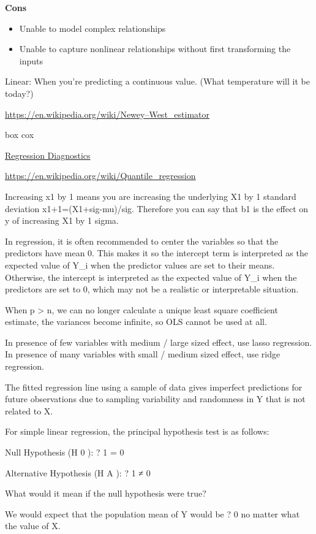 \documentclass[]{book}
\theoremstyle{definition}
\theoremstyle{definition}
\theoremstyle{definition}
\theoremstyle{remark}
\begin{document}
\textbf{Cons}

\begin{itemize}
\item
  Unable to model complex relationships
\item
  Unable to capture nonlinear relationships without first transforming
  the inputs
\end{itemize}

Linear: When you're predicting a continuous value. (What temperature
will it be today?)

\url{https://en.wikipedia.org/wiki/Newey–West_estimator}

box cox

\href{http://www.statmethods.net/stats/rdiagnostics.html}{Regression
Diagnostics}

\url{https://en.wikipedia.org/wiki/Quantile_regression}

Increasing x1 by 1 means you are increasing the underlying X1 by 1
standard deviation x1+1=(X1+sig-mu)/sig. Therefore you can say that b1
is the effect on y of increasing X1 by 1 sigma.

In regression, it is often recommended to center the variables so that
the predictors have mean 0. This makes it so the intercept term is
interpreted as the expected value of Y\_i when the predictor values are
set to their means. Otherwise, the intercept is interpreted as the
expected value of Y\_i when the predictors are set to 0, which may not
be a realistic or interpretable situation.

When p \textgreater{} n, we can no longer calculate a unique least
square coefficient estimate, the variances become infinite, so OLS
cannot be used at all.

In presence of few variables with medium / large sized effect, use lasso
regression. In presence of many variables with small / medium sized
effect, use ridge regression.

The fitted regression line using a sample of data gives imperfect
predictions for future observations due to sampling variability and
randomness in Y that is not related to X.

For simple linear regression, the principal hypothesis test is as
follows:

Null Hypothesis (H 0 ): ? 1 = 0

Alternative Hypothesis (H A ): ? 1 ≠ 0

What would it mean if the null hypothesis were true?

We would expect that the population mean of Y would be ? 0 no matter
what the value of X.
\end{document}
